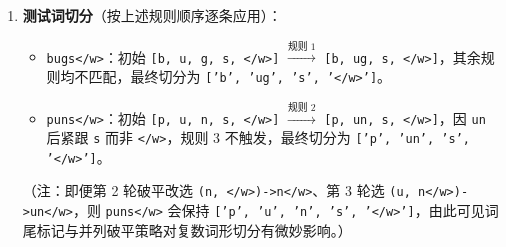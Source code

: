 \begin{enumerate}[label=(\alph*), leftmargin=1.8em]
  \item \textbf{测试词切分}（按上述规则顺序逐条应用）：
  \begin{itemize}
    \item \texttt{bugs</w>}：初始 \texttt{[b, u, g, s, </w>]} $\xrightarrow{\text{规则 1}}$ \texttt{[b, ug, s, </w>]}，其余规则均不匹配，最终切分为 \texttt{['b', 'ug', 's', '</w>']}。
    \item \texttt{puns</w>}：初始 \texttt{[p, u, n, s, </w>]} $\xrightarrow{\text{规则 2}}$ \texttt{[p, un, s, </w>]}，因 \texttt{un} 后紧跟 \texttt{s} 而非 \texttt{</w>}，规则 3 不触发，最终切分为 \texttt{['p', 'un', 's', '</w>']}。
  \end{itemize}
  （注：即便第 2 轮破平改选 \texttt{(n, </w>)->n</w>}、第 3 轮选 \texttt{(u, n</w>)->un</w>}，则 \texttt{puns</w>} 会保持 \texttt{['p', 'u', 'n', 's', '</w>']}，由此可见词尾标记与并列破平策略对复数词形切分有微妙影响。）
\end{enumerate}

